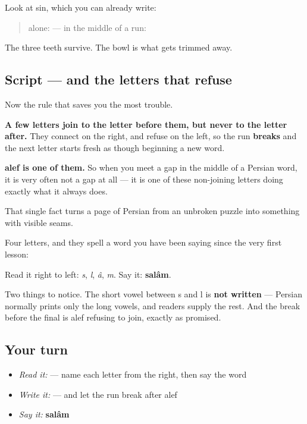 Look at sin, which you can already write:

\begin{quote}
alone: \textbf{} — in the middle of a run: \textbf{}
\end{quote}

The three teeth survive. The bowl is what gets trimmed away.

\subsection*{Script — and the letters that refuse}
Now the rule that saves you the most trouble.

\textbf{A few letters join to the letter before them, but never to the letter after.} They connect on the right, and refuse on the left, so the run \textbf{breaks} and the next letter starts fresh as though beginning a new word.

\textbf{alef is one of them.} So when you meet a gap in the middle of a Persian word, it is very often not a gap at all — it is one of these non-joining letters doing exactly what it always does.

That single fact turns a page of Persian from an unbroken puzzle into something with visible seams.

\begin{grammarlens}[title={What you've built}]
Four letters, and they spell a word you have been saying since the very first lesson:

\begin{quote}
\end{quote}

Read it right to left: \textbf{} \emph{s}, \textbf{} \emph{l}, \textbf{} \emph{â}, \textbf{} \emph{m}. Say it: \textbf{salâm}.

Two things to notice. The short vowel between s and l is \textbf{not written} — Persian normally prints only the long vowels, and readers supply the rest. And the break before the final  is alef refusing to join, exactly as promised.
\end{grammarlens}

\subsection*{Your turn}
\begin{itemize}
\raggedright
  \item \emph{Read it:}  — name each letter from the right, then say the word
  \item \emph{Write it:}  — and let the run break after alef
  \item \emph{Say it:} \textbf{salâm}
\end{itemize}

